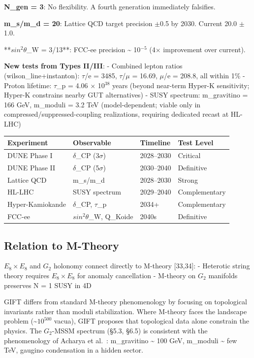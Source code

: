 \documentclass[11pt,a4paper]{article}
\begin{document}
\textbf{N\_gen = 3}: No flexibility. A fourth generation immediately
falsifies.

\textbf{m\_s/m\_d = 20}: Lattice QCD target precision \(\pm 0\).5 by
2030. Current 20.0 \(\pm\) 1.0.

**\(sin^{2} \theta\)\_W = 3/13**: FCC-ee precision \textasciitilde{}
10\(^{-5}\) (4\(\times\) improvement over current).

\textbf{New tests from Types II/III}: - Combined lepton ratios
(wilson\_line+instanton): \(\tau\)/e = 3485, \(\tau\)/\(\mu\) = 16.69,
\(\mu\)/e = 208.8, all within 1\% - Proton lifetime: \(\tau\)\_p =
4.06 \(\times\) 10\(^{38}\) years (beyond near-term Hyper-K sensitivity;
Hyper-K constrains nearby GUT alternatives) - SUSY spectrum:
m\_gravitino = 166 GeV, m\_moduli = 3.2 TeV (model-dependent; viable
only in compressed/suppressed-coupling realizations, requiring dedicated
recast at HL-LHC)

\begin{longtable}[]{@{}llll@{}}
\toprule\noalign{}
Experiment & Observable & Timeline & Test Level \\
\midrule\noalign{}
\endhead
\bottomrule\noalign{}
\endlastfoot
DUNE Phase I & \(\delta\)\_CP (3\(\sigma\)) & 2028--2030 & Critical \\
DUNE Phase II & \(\delta\)\_CP (5\(\sigma\)) & 2030--2040 &
Definitive \\
Lattice QCD & m\_s/m\_d & 2028--2030 & Strong \\
HL-LHC & SUSY spectrum & 2029--2040 & Complementary \\
Hyper-Kamiokande & \(\delta\)\_CP, \(\tau\)\_p & 2034+ &
Complementary \\
FCC-ee & \(sin^{2} \theta\)\_W, Q\_Koide & 2040s & Definitive \\
\end{longtable}


\subsection{Relation to M-Theory}

\(E_{8} \times E_{8}\) and \(G_{2}\) holonomy connect directly to
M-theory {[}33,34{]}: - Heterotic string theory requires
\(E_{8} \times E_{8}\) for anomaly cancellation \cite{19} - M-theory on
\(G_{2}\) manifolds preserves N = 1 SUSY in 4D \cite{34}

GIFT differs from standard M-theory phenomenology \cite{35} by focusing
on topological invariants rather than moduli stabilization. Where
M-theory faces the landscape problem (\textasciitilde{}\(10^{500}\)
vacua), GIFT proposes that topological data alone constrain the physics.
The \(G_{2}\)-MSSM spectrum (§5.3, §6.5) is consistent with the
phenomenology of Acharya et al.~\cite{33}: m\_gravitino \textasciitilde{}
100 GeV, m\_moduli \textasciitilde{} few TeV, gaugino condensation in a
hidden sector.
\end{document}
